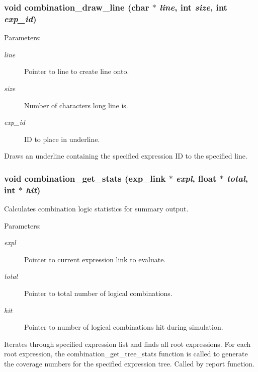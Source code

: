 \subsubsection{\setlength{\rightskip}{0pt plus 5cm}void combination\_\-draw\_\-line (char $\ast$ {\em line}, int {\em size}, int {\em exp\_\-id})}\label{comb_8c_a11}


\begin{Desc}
\item[Parameters: ]\par
\begin{description}
\item[{\em 
line}]Pointer to line to create line onto. \item[{\em 
size}]Number of characters long line is. \item[{\em 
exp\_\-id}]ID to place in underline.\end{description}
\end{Desc}
Draws an underline containing the specified expression ID to the specified line. 
\subsubsection{\setlength{\rightskip}{0pt plus 5cm}void combination\_\-get\_\-stats ({\bf exp\_\-link} $\ast$ {\em expl}, float $\ast$ {\em total}, int $\ast$ {\em hit})}\label{comb_8c_a8}


Calculates combination logic statistics for summary output.

\begin{Desc}
\item[Parameters: ]\par
\begin{description}
\item[{\em 
expl}]Pointer to current expression link to evaluate. \item[{\em 
total}]Pointer to total number of logical combinations. \item[{\em 
hit}]Pointer to number of logical combinations hit during simulation.\end{description}
\end{Desc}
Iterates through specified expression list and finds all root expressions. For each root expression, the combination\_\-get\_\-tree\_\-stats function is called to generate the coverage numbers for the specified expression tree. Called by report function. 
